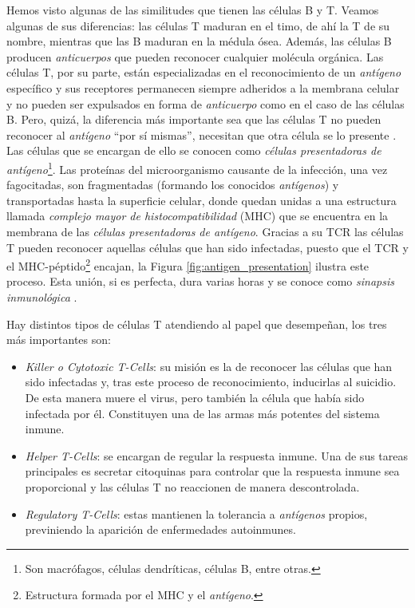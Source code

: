 Hemos visto algunas de las similitudes que tienen las células B y T. Veamos algunas de sus diferencias: las células T maduran en el timo, de ahí la T de su nombre, mientras que las B maduran en la médula ósea. Además, las células B producen \textit{anticuerpos} que pueden reconocer cualquier molécula orgánica. Las células T, por su parte, están especializadas en el reconocimiento de un \textit{antígeno} específico y sus receptores permanecen siempre adheridos a la membrana celular y no pueden ser expulsados en forma de \textit{anticuerpo} como en el caso de las células B. Pero, quizá, la diferencia más importante sea que las células T no pueden reconocer al \textit{antígeno} ``por sí mismas'', necesitan que otra célula se lo presente \citep{theHowItWorks}. Las células que se encargan de ello se conocen como \textit{células presentadoras de antígeno}\footnote{Son macrófagos, células dendríticas, células B, entre otras.}. Las proteínas del microorganismo causante de la infección, una vez fagocitadas, son fragmentadas (formando los conocidos \textit{antígenos}) y transportadas hasta la superficie celular, donde quedan unidas a una estructura llamada \textit{complejo mayor de histocompatibilidad} (MHC) que se encuentra en la membrana de las \textit{células presentadoras de antígeno}. Gracias a su TCR las células T pueden reconocer aquellas células que han sido infectadas, puesto que el TCR y el MHC-péptido\footnote{Estructura formada por el MHC y el \textit{antígeno}.} encajan, la Figura \ref{fig:antigen_presentation} ilustra este proceso. Esta unión, si es perfecta, dura varias horas y se conoce como \textit{sinapsis inmunológica} \citep{fernandez2012mecanica}.



Hay distintos tipos de células T atendiendo al papel que desempeñan, los tres más importantes son: 
\begin{itemize}
	\item \textit{Killer o Cytotoxic T-Cells}: su misión es la de reconocer las células que han sido infectadas y, tras este proceso de reconocimiento, inducirlas al suicidio. De esta manera muere el virus, pero también la célula que había sido infectada por él. Constituyen una de las armas más potentes del sistema inmune.
	
	\item \textit{Helper T-Cells}: se encargan de regular la respuesta inmune. Una de sus tareas principales es secretar citoquinas para controlar que la respuesta inmune sea proporcional y las células T no reaccionen de manera descontrolada.
	
	\item \textit{Regulatory T-Cells}: estas mantienen la tolerancia a \textit{antígenos} propios, previniendo la aparición de enfermedades autoinmunes.
\end{itemize}



